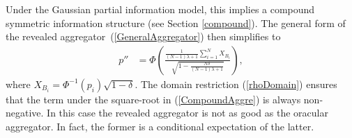 \documentclass[11pt]{article}
\theoremstyle{definition}
\theoremstyle{definition}
\begin{document}


Under the Gaussian partial information model, this implies a compound
symmetric information structure (see Section \ref{compound}). The
general form of the revealed aggregator~(\ref{GeneralAggregator}) then
simplifies to
\begin{align}
p''
  &=\Phi\left(\frac{\frac{1}{(N-1)\lambda +1} 
  \sum_{i=1}^N X_{B_i} }{\sqrt{1- \frac{N\delta}{(N-1)\lambda +1} }}  
  \right), \label{CompoundAggre}
\end{align}
where  $X_{B_i} =
\Phi^{-1}(p_i)\sqrt{1-\delta}$. 
The domain restriction (\ref{rhoDomain}) ensures that the term under
the square-root in (\ref{CompoundAggre}) is always non-negative. In
this case the revealed aggregator is not as good as the oracular
aggregator. In fact, the former is a conditional expectation of the latter.
\end{document}
